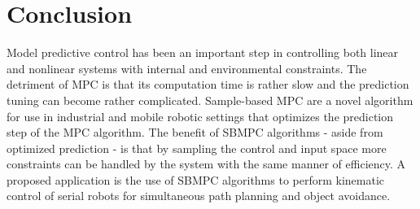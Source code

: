 \documentclass[main.tex]{subfile}
\begin{document}
\section{Conclusion} 
\label{sec:conclusion}

Model predictive control has been an important step in controlling both linear
and nonlinear systems with internal and environmental constraints. The detriment
of MPC is that its computation time is rather slow and the prediction tuning can
become rather complicated. Sample-based MPC are a novel algorithm for use in
industrial and mobile robotic settings that optimizes the prediction step of the
MPC algorithm. The benefit of SBMPC algorithms - aside from optimized prediction
- is that by sampling the control and input space more constraints can be
handled by the system with the same manner of efficiency. A proposed application
is the use of SBMPC algorithms to perform kinematic control of serial robots for
simultaneous path planning and object avoidance.

\end{document}
